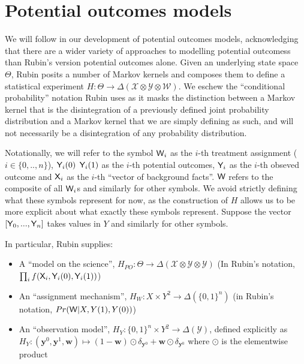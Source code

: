 
\section{Potential outcomes models}\label{sec:counterfactuals}

We will follow \cite{rubin_causal_2005} in our development of potential outcomes models, acknowledging that there are a wider variety of approaches to modelling potential outcomess than Rubin's version potential outcomes alone. Given an underlying state space $\Theta$, Rubin posits a number of Markov kernels and composes them to define a statistical experiment $H:\Theta\to \Delta(\mathcal{X}\otimes\mathcal{Y}\otimes \mathcal{W})$. We eschew the ``conditional probability'' notation Rubin uses as it masks the distinction between a Markov kernel that is the disintegration of a previously defined joint probability distribution and a Markov kernel that we are simply defining as such, and will not necessarily be a disintegration of any probability distribution.

Notationally, we will refer to the symbol $\mathsf{W}_i$ as the $i$-th treatment assignment ($i\in \{0,..,n\}$), $\mathsf{Y}_i(0)$ $\mathsf{Y}_i(1)$ as the $i$-th potential outcomes, $\mathsf{Y}_i$ as the $i$-th obseved outcome and $\mathsf{X}_i$ as the $i$-th ``vector of background facts''. $\mathsf{W}$ refers to the composite of all $\mathsf{W}_i$s and similarly for other symbols. We avoid strictly defining what these symbols represent for now, as the construction of $H$ allows us to be more explicit about what exactly these symbols represent. Suppose the vector $[\mathsf{Y}_0,...,\mathsf{Y}_n]$ takes values in $Y$ and similarly for other symbols.

In particular, Rubin supplies:
\begin{itemize}
\item A ``model on the science'', $H_{PO}:\Theta \to \Delta(\mathcal{X}\otimes\mathcal{Y}\otimes\mathcal{Y})$ (In Rubin's notation, $\prod_i f(\mathsf{X}_i,\mathsf{Y}_i(0),\mathsf{Y}_i(1))$)
\item An ``assignment mechanism'', $H_W:X\times Y^2 \to \Delta(\{0,1\}^n)$ (in Rubin's notation, $Pr(\mathsf{W}|X,Y(1),Y(0))$)
\item An ``observation model'', $H_Y:\{0,1\}^n\times Y^2\to \Delta(\mathcal{Y})$, defined explicitly as $H_Y:(\mathbf{y}^0,\mathbf{y}^1,\mathbf{w})\mapsto (1-\mathbf{w}) \odot \delta_{\mathbf{y}^0} + \mathbf{w} \odot \delta_{\mathbf{y}^0}$ where $\odot$ is the elementwise product
\end{itemize}

